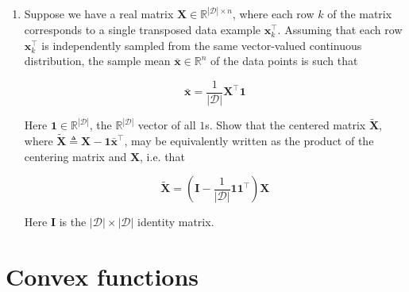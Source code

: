 \documentclass{article}
\numberwithin{equation}{section}
\begin{document}
\begin{enumerate}
    \item
    Suppose we have a real matrix $ \mathbf{X} \in
    \mathbb{R}^{|\mathcal{D}| \times n} $, where each row $ k $ of the matrix
    corresponds to a single transposed data example $ \mathbf{x}_k^\top $.
    Assuming that each row $ \mathbf{x}_k^\top $ is independently sampled from
    the same vector-valued continuous distribution, the sample mean
    $ \bar{\mathbf{x}} \in \mathbb{R}^n $ of the data points is such that
    
    \begin{equation*}
        \bar{\mathbf{x}} = \frac{1}{|\mathcal{D}|}\mathbf{X}^\top\mathbf{1}
    \end{equation*}

    Here $ \mathbf{1} \in \mathbb{R}^{|\mathcal{D}|} $, the
    $ \mathbb{R}^{|\mathcal{D}|} $ vector of all $ 1 $s. Show that the centered
    matrix $ \tilde{\mathbf{X}} $, where $ \tilde{\mathbf{X}} \triangleq
    \mathbf{X} - \mathbf{1}\bar{\mathbf{x}}^\top $, may be equivalently written
    as the product of the centering matrix and $ \mathbf{X} $, i.e. that

    \begin{equation*}
        \tilde{\mathbf{X}} = \left(\mathbf{I} - \frac{1}{|\mathcal{D}|}
        \mathbf{11}^\top\right)\mathbf{X}
    \end{equation*}

    Here $ \mathbf{I} $ is the $ |\mathcal{D}| \times |\mathcal{D}| $ identity
    matrix.
\end{enumerate}

\section{Convex functions}
\end{document}
